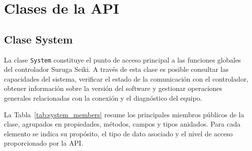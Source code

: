 \documentclass[../../main.tex]{subfiles}
\begin{document}
\chapter{Clases de la API}



\section{Clase System}

La clase \texttt{System} constituye el punto de acceso principal a las funciones globales del controlador Suruga Seiki. A través de esta clase es posible consultar las capacidades del sistema, verificar el estado de la comunicación con el controlador, obtener información sobre la versión del software y gestionar operaciones generales relacionadas con la conexión y el diagnóstico del equipo.

La Tabla~\ref{tab:system_members} resume los principales miembros públicos de la clase, agrupados en propiedades, métodos, campos y tipos anidados. Para cada elemento se indica su propósito, el tipo de dato asociado y el nivel de acceso proporcionado por la API.


\footnotesize
\end{document}
